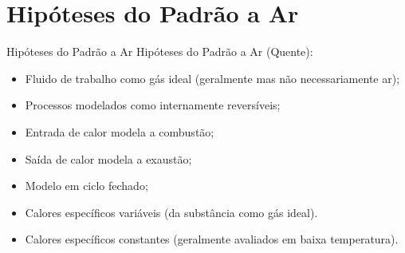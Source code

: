 \section{Hipóteses do Padrão a Ar}

    \begin{frame}{Hipóteses do Padrão a Ar}\vspace*{-1em}
        Hipóteses do Padrão a Ar (Quente):

        \begin{itemize}
            \item<1->  Fluido de trabalho como \alert{gás ideal} (geralmente mas não
                necessariamente \alert{ar});
            \item<2->  Processos modelados como \alert{internamente reversíveis};
            \item<3->  Entrada de \alert{calor} modela a combustão;
            \item<4->  Saída de \alert{calor} modela a exaustão;
            \item<5->  Modelo em \alert{ciclo fechado};
            \item<6->  Calores específicos \alert{variáveis} (da substância como gás ideal).
        \end{itemize}
        \vspace*\medskipamount

        
        \begin{itemize}
            \item<7->  Calores específicos \alert{constantes} (geralmente avaliados em
                \alert{baixa temperatura}).
        \end{itemize}
    \end{frame}

